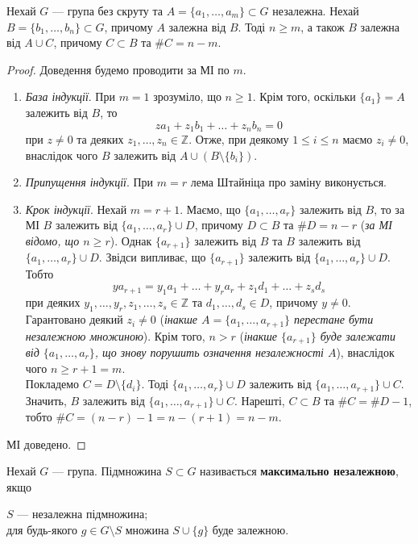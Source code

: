 \documentclass{math_library}
\begin{document}
\begin{theorem}
Нехай $G$ --- група без скруту та $A = \{a_1,\dots,a_m\} \subset G$ незалежна. Нехай $B = \{b_1,\dots,b_n\} \subset G$, причому $A$ залежна від $B$. Тоді $n \geq m$, а також $B$ залежна від $A \cup C$, причому $C \subset B$ та $\# C = n-m$. 
\end{theorem}

\begin{proof}
Доведення будемо проводити за МІ по $m$.
\begin{enumerate}[wide=0pt,label={\Roman*.}]
\item \textit{База індукції}. При $m = 1$ зрозуміло, що $n \geq 1$. Крім того, оскільки $\{a_1\} = A$ залежить від $B$, то
\[
z a_1 + z_1 b_1 + \dots + z_n b_n = 0
\]
при $z \neq 0$ та деяких $z_1,\dots,z_n \in \mathbb{Z}$. Отже, при деякому $1 \leq i \leq n$ маємо $z_i \neq 0$, внаслідок чого $B$ залежить від $A \cup (B \setminus \{b_i\})$.

\item \textit{Припущення індукції}. При $m = r$ лема Штайніца про заміну виконується.

\item \textit{Крок індукції}. Нехай $m = r+1$. Маємо, що $\{a_1,\dots,a_r\}$ залежить від $B$, то за МІ $B$ залежить від $\{a_1,\dots,a_r\} \cup D$, причому $D \subset B$ та $\# D = n-r$ (\textit{за МІ відомо, що $n \geq r$}). Однак $\{a_{r+1}\}$ залежить від $B$ та $B$ залежить від $\{a_1,\dots,a_r\} \cup D$. Звідси випливає, що $\{a_{r+1}\}$ залежить від $\{a_1,\dots,a_r\} \cup D$. Тобто
\[
ya_{r+1} = y_1 a_1 + \dots + y_r a_r + z_1 d_1 + \dots + z_s d_s
\]
при деяких $y_1,\dots,y_r,z_1,\dots,z_s \in \mathbb{Z}$ та $d_1,\dots,d_s \in D$, причому $y \neq 0$. Гарантовано деякий $z_i \neq 0$ (\textit{інакше $A = \{a_1,\dots,a_{r+1}\}$ перестане бути незалежною множиною}). Крім того, $n > r$ (\textit{інакше $\{a_{r+1}\}$ буде залежати від $\{a_1,\dots,a_r\}$, що знову порушить означення незалежності $A$}), внаслідок чого $n \geq r+1 = m$.\\
Покладемо $C = D \setminus \{d_i\}$. Тоді $\{a_1,\dots,a_r\} \cup D$ залежить від $\{a_1,\dots,a_{r+1}\} \cup C$. Значить, $B$ залежить від $\{a_1,\dots,a_{r+1}\} \cup C$. Нарешті, $C \subset B$ та $\# C = \# D - 1$, тобто $\# C = (n-r)-1 = n-(r+1) = n-m$.
\end{enumerate}
МІ доведено.
\end{proof}

\begin{definition}
Нехай $G$ --- група. Підмножина $S \subset G$ називається \textbf{максимально незалежною}, якщо
\begin{center}
$S$ --- незалежна підмножина; \\
для будь-якого $g \in G \setminus S$ множина $S \cup \{g\}$ буде залежною. 
\end{center}
\end{definition}
\end{document}
